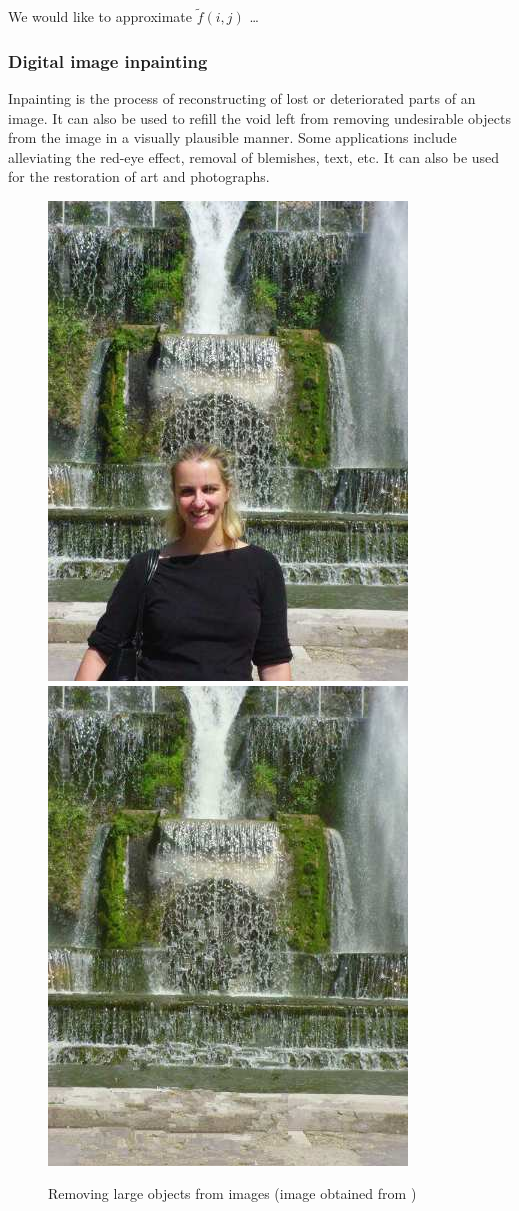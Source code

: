 \documentclass[11pt]{article} %
\theoremstyle{plain}
\theoremstyle{definition}
\theoremstyle{remark}
\begin{document}
We would like to approximate $\tilde{f}(i, j)$ \dots


\subsubsection{Digital image inpainting}

Inpainting is the process of reconstructing of lost or deteriorated parts of an image. It 
can also be used to refill the void left from removing undesirable objects from the image
in a visually plausible manner. Some applications include alleviating the red-eye effect,
removal of blemishes, text, etc. It can also be used for the restoration
of art and photographs.

\begin{figure}[H]
\centering
  \includegraphics[width=0.45\columnwidth]{../figures/researchmicros-000.jpg}
  \hfill
  \includegraphics[width=0.45\columnwidth]{../figures/researchmicros-001.jpg}
\caption{Removing large objects from images (image obtained from \cite{Criminisi2004})}
\end{figure}
\end{document}
